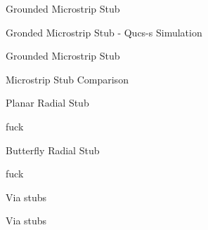 \begin{frame}{Grounded Microstrip Stub}
\end{frame}

\begin{frame}{Gronded Microstrip Stub - Qucs-s Simulation}
\end{frame}

\begin{frame}{Grounded Microstrip Stub}
    \begin{twocolumns}[0.3]
        \leftcol
            \vspace{-30pt}
        \rightcol
            \vspace{-40pt}
    \end{twocolumns}
\end{frame}

\begin{frame}{Microstrip Stub Comparison}
    \vspace{-30pt}
\end{frame}

\begin{frame}{Planar Radial Stub}
    \begin{twocolumns}[0.5]
        \leftcol
            \vspace{-30pt}
        \rightcol
            fuck
    \end{twocolumns}
\end{frame}

\begin{frame}{Butterfly Radial Stub}
    \begin{twocolumns}[0.5]
        \leftcol
            \vspace{-30pt}
        \rightcol
            fuck
    \end{twocolumns}
\end{frame}

\begin{frame}{Via stubs}
\end{frame}

\begin{frame}{Via stubs}
\end{frame}



